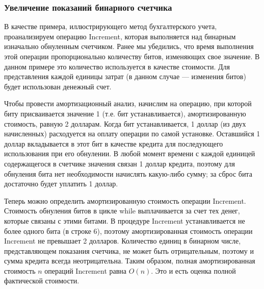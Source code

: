 \subsubsection{Увеличение показаний бинарного счетчика}

В качестве примера, иллюстрирующего метод бухгалтерского учета,
проанализируем операцию Increment, которая выполняется над бинарным изначально обнуленным счетчиком.
Ранее мы убедились, что время выполнения этой операции пропорционально количеству битов, изменяющих свое значение.
В данном примере это количество используется в качестве стоимости.
Для представления каждой единицы затрат (в данном случае ---
изменения битов) будет использован денежный счет.

Чтобы провести амортизационный анализ, начислим на операцию, при которой биту присваивается значение 1 (т.е. бит устанавливается), амортизированную стоимость, равную 2 долларам.
Когда бит устанавливается, 1 доллар (из двух начисленных) расходуется на оплату операции по самой установке.
Оставшийся 1 доллар вкладывается в этот бит в качестве кредита для последующего использования при его обнулении.
В любой момент времени с каждой единицей содержащегося в счетчике значения связан 1 доллар кредита, поэтому для обнуления бита нет необходимости начислять какую-либо сумму; за сброс бита достаточно
будет уплатить 1 доллар.

Теперь можно определить амортизированную стоимость операции Increment.
Стоимость обнуления битов в цикле while выплачивается за счет тех денег, которые связаны с этими битами.
В процедуре Increment устанавливается не более одного бита (в строке 6), поэтому амортизированная стоимость операции Increment не превышает 2 долларов.
Количество единиц в бинарном числе, представляющем показания счетчика, не может быть отрицательным, поэтому и сумма кредита всегда неотрицательна.
Таким образом, полная амортизированная стоимость $n$ операций Increment равна $O(n)$.
Это и есть оценка полной фактической стоимости.

